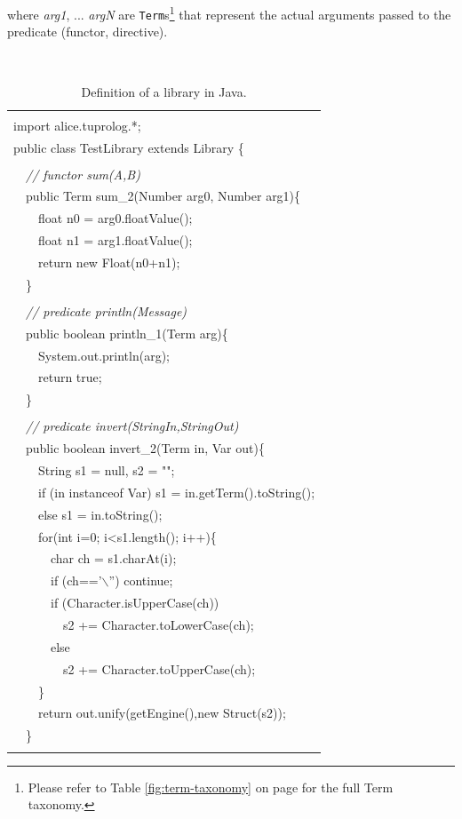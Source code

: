 \noindent where \textit{arg1}, ... \textit{argN} are \texttt{Term}s\footnote{%
 Please refer to Table \ref{fig:term-taxonomy} on page \pageref{fig:term-taxonomy} for the full Term taxonomy.}
that represent the actual arguments passed to the predicate (functor, directive).

\begin{table}
    \begin{center}{\small\tt
    \begin{tabular}{p{12cm}}
     \hline\\
    import alice.tuprolog.*;\\
    public class TestLibrary extends Library \{\\
    \\
    ~~\textit{// functor sum(A,B)}\\
    ~~public Term sum\_2(Number arg0, Number arg1)\{\\
    ~~~~float  n0 = arg0.floatValue();\\
    ~~~~float  n1 = arg1.floatValue();\\
    ~~~~return new Float(n0+n1);\\
    ~~\}\\
    \\
    ~~\textit{// predicate println(Message)}\\
    ~~public boolean println\_1(Term arg)\{\\
    ~~~~System.out.println(arg);\\
    ~~~~return true;\\
    ~~\}\\
    \\
    ~~\textit{// predicate invert(StringIn,StringOut)}\\
    ~~public boolean invert\_2(Term in, Var out)\{\\
    ~~~~String s1 = null, s2 = "";\\
	~~~~if (in instanceof Var) s1 = in.getTerm().toString();\\
	~~~~else s1 = in.toString();\\
	~~~~for(int i=0; i<s1.length(); i++)\{\\
	~~~~~~char ch = s1.charAt(i);\\
	~~~~~~if (ch=='$\backslash$'') continue;\\
	~~~~~~if (Character.isUpperCase(ch))\\
	~~~~~~~~s2 += Character.toLowerCase(ch);\\
	~~~~~~else\\
	~~~~~~~~s2 += Character.toUpperCase(ch);\\
	~~~~\}\\
	~~~~return out.unify(getEngine(),new Struct(s2));\\
    ~~\}\\
    \\\hline
    \end{tabular}
    }\end{center}
    \caption{Definition of a \tuprolog{} library in Java.}
    \label{tab:TestLibrary}
\end{table}

